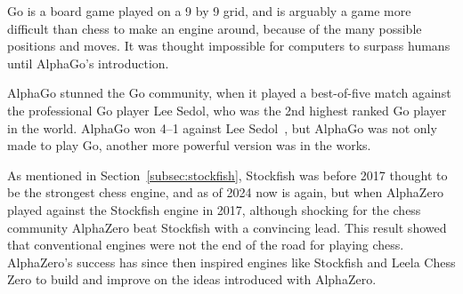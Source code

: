 Go is a board game played on a 9 by 9 grid, and is arguably a game more difficult than chess to make an engine around,
because of the many possible positions and moves.
It was thought impossible for computers to surpass humans until AlphaGo's introduction.

AlphaGo stunned the Go community, when it played a best-of-five match against the professional
Go player Lee Sedol, who was the 2nd highest ranked Go player in the world.
AlphaGo won 4--1 against Lee Sedol~\cite{alpha-go-zero}, but AlphaGo was not only made to play Go, another more powerful
version was in the works.

As mentioned in Section~\ref{subsec:stockfish}, Stockfish was before 2017 thought to be the strongest chess engine,
and as of 2024 now is again, but when AlphaZero played against the Stockfish engine in 2017, although shocking for the
chess community AlphaZero beat Stockfish with a convincing lead.
This result showed that conventional engines were not the end of the road for playing chess.
AlphaZero's success has since then inspired engines like Stockfish and Leela Chess Zero to build and improve on the ideas
introduced with AlphaZero.
